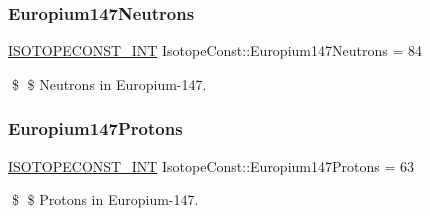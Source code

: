 \subsubsection{\texorpdfstring{Europium147\+Neutrons}{Europium147Neutrons}}
{\footnotesize\ttfamily \mbox{\hyperlink{group___isotope_const-_macros_ga5f18360b3e99483a35c32d789e62621c}{I\+S\+O\+T\+O\+P\+E\+C\+O\+N\+S\+T\+\_\+\+I\+NT}} Isotope\+Const\+::\+Europium147\+Neutrons = 84}

\$ \$ Neutrons in Europium-\/147. \mbox{\label{group___isotope_const-_europium-_eu147_ga7088c370cba8c5a15ebb73a70189bb87}} 
\subsubsection{\texorpdfstring{Europium147\+Protons}{Europium147Protons}}
{\footnotesize\ttfamily \mbox{\hyperlink{group___isotope_const-_macros_ga5f18360b3e99483a35c32d789e62621c}{I\+S\+O\+T\+O\+P\+E\+C\+O\+N\+S\+T\+\_\+\+I\+NT}} Isotope\+Const\+::\+Europium147\+Protons = 63}

\$ \$ Protons in Europium-\/147. 